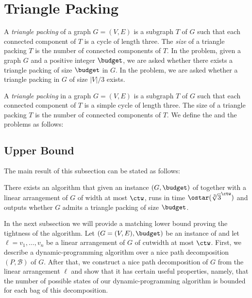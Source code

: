 \documentclass[a4paper,UKenglish,cleveref, autoref, thm-restate]{lipics-v2021}
\begin{document}
\section{Triangle Packing}\label{sec:tp}
 A \emph{triangle packing} of a graph $G=(V,E)$ is a subgraph $T$ of $G$ such that each connected component of $T$ is a cycle of length three.  
 The \emph{size} of a triangle packing $T$ is the number of connected components of $T$.
 In the \Tpacp problem, given a graph $G$ and a positive integer $\budget$, we are asked whether there exists a triangle packing of size $\budget$ in $G$. 
 In the \Tpartp problem, we are asked whether a triangle packing in $G$ of size $|V|/3$ exists.
\begin{definition}
    A \emph{triangle packing} in a graph $G=(V,E)$ is a subgraph $T$ of $G$ such that each connected component of $T$ is a simple cycle of length three. The size of a triangle packing $T$ is the number of connected components of $T$.
    We define the \Tpacp and the \Tpartp problems as follows:
    

    \vspace{.2em}

\end{definition}

\subsection{Upper Bound}\label{subsec:tripack-algo}

The main result of this subsection can be stated as follows:
\begin{theorem}\label{thm:tripack}
    There exists an algorithm that given an instance $(G, \budget)$ of \Tpacp together with a linear arrangement of $G$ of width at most $\ctw$, runs in time $\ostar(\sqrt[3]{3}^{\ctw})$ and outputs whether $G$ admits a triangle packing of size $\budget$.
\end{theorem}

In the next subsection we will provide a matching lower bound proving the tightness of the algorithm.
Let $(G = (V,E), \budget)$ be an instance of \Tpacp and let $\ell = v_1, \dots, v_n$ be a linear arrangement of $G$ of cutwidth at most $\ctw$.
First, we describe a dynamic-programming algorithm over a nice path decomposition $(P, \mathcal{B})$ of $G$. 
After that, we construct a nice path decomposition of $G$ from the linear arrangement $\ell$ and show that it has certain useful properties, namely, that the number of possible states of our dynamic-programming algorithm is bounded for each bag of this decomposition.
\end{document}
